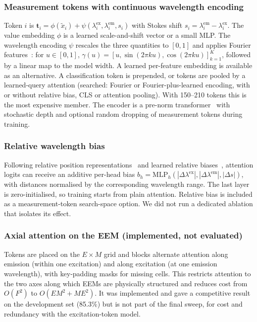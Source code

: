 \documentclass[journal]{IEEEtran}
\newcommand{\lex}{\lambda^{\mathrm{ex}}}
\newcommand{\lem}{\lambda^{\mathrm{em}}}
\begin{document}
\subsubsection{Measurement tokens with continuous wavelength encoding}
Token $i$ is $\mathbf{t}_i=\phi(\tilde x_i)+\psi(\lex_i,\lem_i,s_i)$ with Stokes shift $s_i=\lem_i-\lex_i$. The value embedding $\phi$ is a learned scale-and-shift vector or a small MLP. The wavelength encoding $\psi$ rescales the three quantities to $[0,1]$ and applies Fourier features~\cite{tancik2020fourier}: for $u\in[0,1]$, $\gamma(u)=[u,\sin(2\pi k u),\cos(2\pi k u)]_{k=1}^{K}$, followed by a linear map to the model width. A learned per-feature embedding is available as an alternative. A classification token is prepended, or tokens are pooled by a learned-query attention (searched: Fourier or Fourier-plus-learned encoding, with or without relative bias, CLS or attention pooling). With 150--210 tokens this is the most expensive member. The encoder is a pre-norm transformer~\cite{vaswani2017attention} with stochastic depth and optional random dropping of measurement tokens during training.

\subsubsection{Relative wavelength bias}
Following relative position representations~\cite{shaw2018relpos} and learned relative biases~\cite{raffel2020t5}, attention logits can receive an additive per-head bias $b_h=\mathrm{MLP}_h(|\Delta\lex|,|\Delta\lem|,|\Delta s|)$, with distances normalised by the corresponding wavelength range. The last layer is zero-initialised, so training starts from plain attention. Relative bias is included as a measurement-token search-space option. We did not run a dedicated ablation that isolates its effect.

\subsubsection{Axial attention on the EEM (implemented, not evaluated)}
Tokens are placed on the $E\times M$ grid and blocks alternate attention along emission (within one excitation) and along excitation (at one emission wavelength), with key-padding masks for missing cells. This restricts attention to the two axes along which EEMs are physically structured and reduces cost from $O(F^2)$ to $O(E M^2+M E^2)$. It was implemented and gave a competitive result on the development set (85.3\%) but is not part of the final sweep, for cost and redundancy with the excitation-token model.
\end{document}
